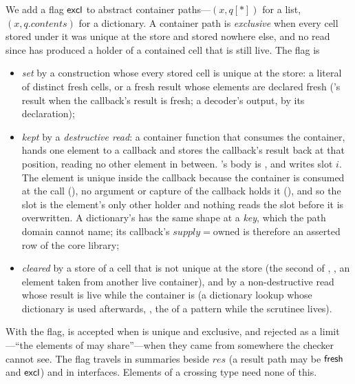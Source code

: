 We add a flag $\mathsf{excl}$ to abstract container paths---$(x, q[\ast])$ for a list, $(x,
q.\mathit{contents})$ for a dictionary. A container path is \emph{exclusive} when every cell stored
under it was unique at the store and stored nowhere else, and no read since has produced a holder of
a contained cell that is still live. The flag is
\begin{itemize}
\item \emph{set} by a construction whose every stored cell is unique at the store: a literal of
distinct fresh cells, or a fresh result whose elements are declared fresh ('s result when
the callback's result is fresh; a decoder's output, by its declaration);
\item \emph{kept} by a \emph{destructive read}: a container function that consumes the container,
hands one element to a callback and stores the callback's result back at that position, reading no
other element in between. 's body is , and
 writes slot $i$. The element is unique inside the callback because the container is
consumed at the call (\Dead), no argument or capture of the callback holds it (\Disjoint), and so the
slot is the element's only other holder and nothing reads the slot before it is overwritten. A
dictionary's  has the same shape at a \emph{key}, which the path domain cannot name; its
callback's $\mathit{supply} = \mathrm{owned}$ is therefore an asserted row of the core library;
\item \emph{cleared} by a store of a cell that is not unique at the store (the second  of
\code{[ r, r ]}, , an element taken from another live container), and by a
non-destructive read whose result is live while the container is (a dictionary lookup whose
dictionary is used afterwards, , the  of a pattern \code{[ x, …rest ]} while
the scrutinee lives).
\end{itemize}
With the flag,  is accepted when
 is unique and exclusive, and rejected as a limit---``the elements of  may
share''---when they came from somewhere the checker cannot see. The flag travels in summaries beside
$\mathit{res}$ (a result path may be $\mathsf{fresh}$ and $\mathsf{excl}$) and in interfaces. Elements of a crossing
type need none of this.
